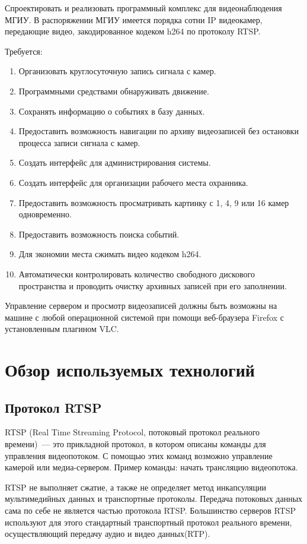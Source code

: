 Спроектировать и реализовать программный комплекс для видеонаблюдения МГИУ. В распоряжении МГИУ
имеется порядка сотни IP видеокамер, передающие видео, закодированное кодеком h264 по протоколу RTSP.

\medskip

Требуется:
\smallskip
\begin{enumerate}
	\item Организовать круглосуточную запись сигнала с камер.
	\item Программными средствами обнаруживать движение.
	\item Сохранять информацию о событиях в базу данных.
	\item Предоставить возможность навигации по архиву видеозаписей без остановки процесса записи сигнала с камер.
	\item Создать интерфейс для администрирования системы.
	\item Создать интерфейс для организации рабочего места охранника.
	\item Предоставить возможность просматривать картинку с 1, 4, 9 или 16 камер одновременно.
	\item Предоставить возможность поиска событий.
	\item Для экономии места сжимать видео кодеком h264.
	\item Автоматически контролировать количество свободного дискового пространства и проводить очистку архивных записей при его заполнении.
\end{enumerate}

Управление сервером и просмотр видеозаписей должны быть возможны на машине с любой операционной
системой при помощи веб-браузера Firefox с установленным плагином VLC.


\section{Обзор используемых технологий}

\subsection{Протокол RTSP}
RTSP (Real Time Streaming Protocol, потоковый протокол реального времени)~--- это прикладной протокол,
в котором описаны команды для управления видеопотоком.
С помощью этих команд возможно управление камерой или медиа-сервером.
Пример команды: начать трансляцию видеопотока.

RTSP не выполняет сжатие, а также не определяет метод инкапсуляции мультимедийных данных и
транспортные протоколы. Передача потоковых данных сама по себе не является частью протокола RTSP.
Большинство серверов RTSP используют для этого стандартный транспортный протокол реального времени,
осуществляющий передачу аудио и видео данных(RTP).

